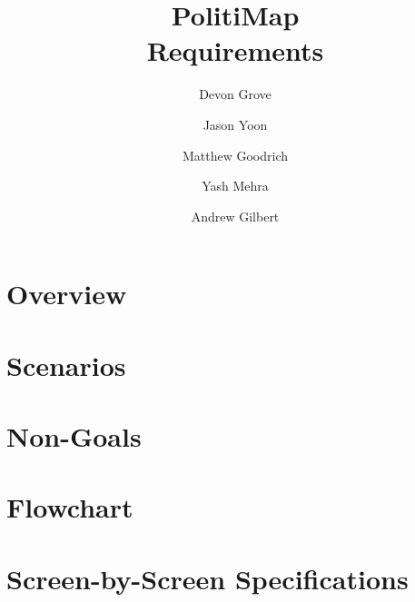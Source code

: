 \documentclass{article}
\title{PolitiMap\\\large Requirements}
\author{Devon Grove \and
  Jason Yoon \and
  Matthew Goodrich \and
  Yash Mehra \and
  Andrew Gilbert}
\date{}
\begin{document}
\maketitle

\section{Overview}
\section{Scenarios}
\section{Non-Goals}
\section{Flowchart}
\section{Screen-by-Screen Specifications}
\end{document}
